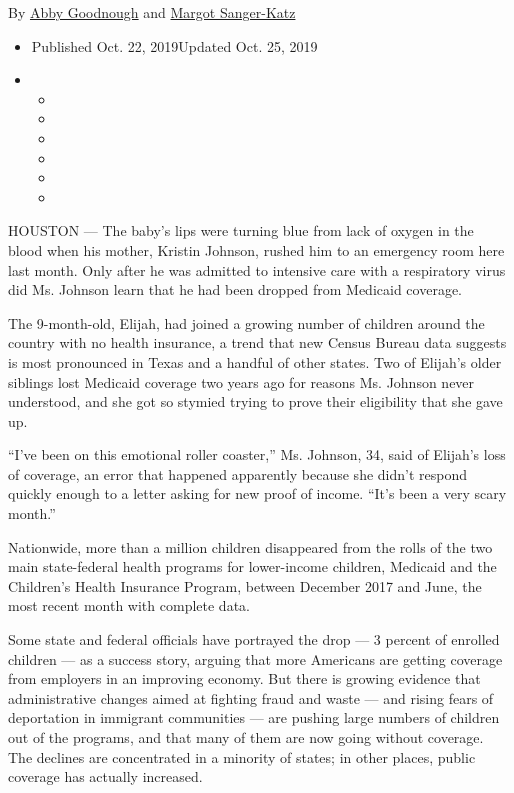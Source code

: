 By \href{https://www.nytimes3xbfgragh.onion/by/abby-goodnough}{Abby
Goodnough} and
\href{https://www.nytimes3xbfgragh.onion/by/margot-sanger-katz}{Margot
Sanger-Katz}

\begin{itemize}
\item
  Published Oct. 22, 2019Updated Oct. 25, 2019
\item
  \begin{itemize}
  \item
  \item
  \item
  \item
  \item
  \item
  \end{itemize}
\end{itemize}

HOUSTON --- The baby's lips were turning blue from lack of oxygen in the
blood when his mother, Kristin Johnson, rushed him to an emergency room
here last month. Only after he was admitted to intensive care with a
respiratory virus did Ms. Johnson learn that he had been dropped from
Medicaid coverage.

The 9-month-old, Elijah, had joined a growing number of children around
the country with no health insurance, a trend that new Census Bureau
data suggests is most pronounced in Texas and a handful of other states.
Two of Elijah's older siblings lost Medicaid coverage two years ago for
reasons Ms. Johnson never understood, and she got so stymied trying to
prove their eligibility that she gave up.

``I've been on this emotional roller coaster,'' Ms. Johnson, 34, said of
Elijah's loss of coverage, an error that happened apparently because she
didn't respond quickly enough to a letter asking for new proof of
income. ``It's been a very scary month.''

Nationwide, more than a million children disappeared from the rolls of
the two main state-federal health programs for lower-income children,
Medicaid and the Children's Health Insurance Program, between December
2017 and June, the most recent month with complete data.

Some state and federal officials have portrayed the drop --- 3 percent
of enrolled children --- as a success story, arguing that more Americans
are getting coverage from employers in an improving economy. But there
is growing evidence that administrative changes aimed at fighting fraud
and waste --- and rising fears of deportation in immigrant communities
--- are pushing large numbers of children out of the programs, and that
many of them are now going without coverage. The declines are
concentrated in a minority of states; in other places, public coverage
has actually increased.

